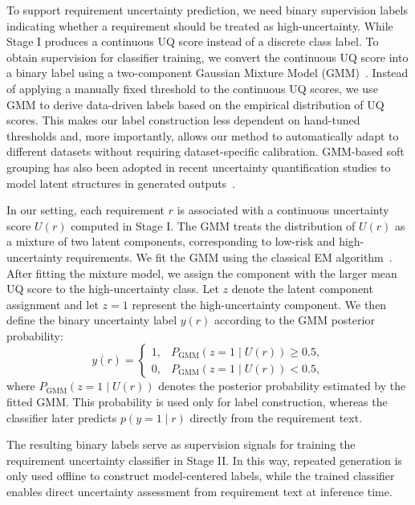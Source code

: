 To support requirement uncertainty prediction, we need binary supervision labels indicating whether a requirement should be treated as high-uncertainty. While Stage I produces a continuous UQ score instead of a discrete class label. To obtain supervision for classifier training, we convert the continuous UQ score into a binary label using a two-component Gaussian Mixture Model (GMM)~\cite{bishop2006pattern}. Instead of applying a manually fixed threshold to the continuous UQ scores, we use GMM to derive data-driven labels based on the empirical distribution of UQ scores. This makes our label construction less dependent on hand-tuned thresholds and, more importantly, allows our method to automatically adapt to different datasets without requiring dataset-specific calibration. GMM-based soft grouping has also been adopted in recent uncertainty quantification studies to model latent structures in generated outputs~\cite{luo2026agsc}.

In our setting, each requirement $r$ is associated with a continuous uncertainty score $U(r)$ computed in Stage I. The GMM treats the distribution of $U(r)$ as a mixture of two latent components, corresponding to low-risk and high-uncertainty requirements. We fit the GMM using the classical EM algorithm~\cite{dempster1977maximum}. After fitting the mixture model, we assign the component with the larger mean UQ score to the high-uncertainty class. Let $z$ denote the latent component assignment and let $z=1$ represent the high-uncertainty component. We then define the binary uncertainty label $y(r)$ according to the GMM posterior probability:
\begin{equation}
\label{eq:gmmLabel}
y(r)=
\begin{cases}
1, & P_{\mathrm{GMM}}(z=1 \mid U(r)) \geq 0.5,\\
0, & P_{\mathrm{GMM}}(z=1 \mid U(r)) < 0.5,
\end{cases}
\end{equation}
where $P_{\mathrm{GMM}}(z=1 \mid U(r))$ denotes the posterior probability estimated by the fitted GMM. This probability is used only for label construction, whereas the classifier later predicts $p(y=1\mid r)$ directly from the requirement text.

The resulting binary labels serve as supervision signals for training the requirement uncertainty classifier in Stage II. In this way, repeated generation is only used offline to construct model-centered labels, while the trained classifier enables direct uncertainty assessment from requirement text at inference time.

